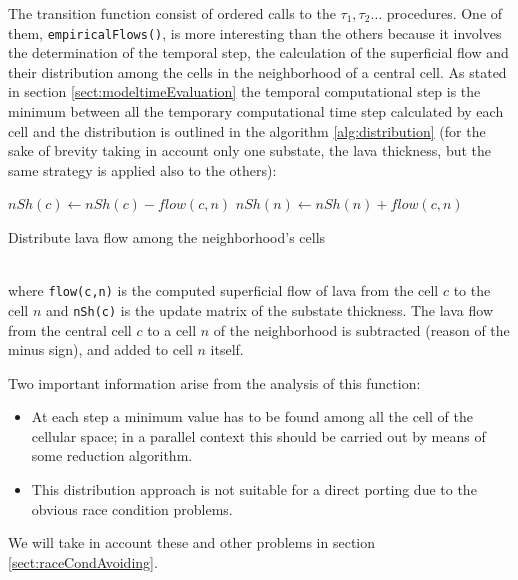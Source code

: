 The transition function consist of ordered calls to the \(\tau_1,\tau_2 \ldots
\) procedures. One of them, \texttt{empiricalFlows()}, is more interesting than
the others because it involves the determination of the temporal step, the
calculation of the superficial flow and their distribution among the cells in
the neighborhood of a central cell.
As stated in section \ref{sect:modeltimeEvaluation} the temporal
computational step is the minimum between all the temporary computational time
step calculated by each cell and the distribution is outlined in the algorithm
\ref{alg:distribution} (for the sake of brevity taking in account only one
substate, the lava thickness, but the same strategy is applied also to the
others):

\begin{algorithm}
\begin{algorithmic}


\STATE $nSh(c) \leftarrow nSh(c)-flow(c,n)$
\STATE $nSh(n) \leftarrow nSh(n)+flow(c,n)$

\ENDFOR
\ENDFOR
	\caption{Distribute lava flow among the neighborhood's cells}
	\label{alg:distribution}
\end{algorithmic}
\hfill\\

where \texttt{flow(c,n)} is the computed superficial flow of lava from the cell
$c$ to the cell $n$ and \texttt{nSh(c)} is the update matrix of the substate thickness.
The lava flow from the central cell \(c\)
to a cell $n$ of the neighborhood is subtracted (reason of the minus sign),
and added to cell $n$ itself.
\end{algorithm}
Two important information arise from the analysis of this function:
\begin{itemize}
  \item At each step a minimum value has to be found among all the cell of
  the cellular space; in a parallel context this should be carried out by means
  of some reduction algorithm.
  \item This distribution approach is not suitable for a direct porting due to
  the obvious race condition problems.
\end{itemize}
We will take in account these and other problems in section
\ref{sect:raceCondAvoiding}.

